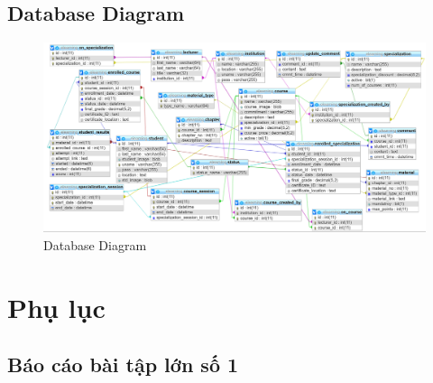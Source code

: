 \documentclass[12pt,a4paper,titlepage]{article}
\begin{document}
\subsection{Database Diagram}
\begin{figure}[h!]
	\centering
	\caption{Database Diagram}
	\includegraphics[width=1.0\textwidth]{images/dbs.png}
\end{figure}
\newpage
\section{Phụ lục}
\subsection{Báo cáo bài tập lớn số 1}
\end{document}
